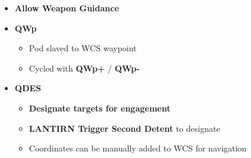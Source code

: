 \documentclass[fontInter]{TechCheck}
\begin{document}
\begin{longtableitemize}
{\begin{tableminipage}
			\begin{itemize}
				\item \textbf{Allow Weapon Guidance}
				\item \textbf{QWp}
				\begin{itemize}
					\item Pod slaved to WCS waypoint
					\item Cycled with \textbf{QWp+} / \textbf{QWp-}
				\end{itemize}
				\item \textbf{QDES}
				\begin{itemize}
					\item \textbf{Designate targets for engagement}
					\item \textbf{LANTIRN Trigger Second Detent} to designate
					\item Coordinates can be manually added to WCS for navigation
				\end{itemize}
			\end{itemize}
		\end{tableminipage}}
	\end{longtableitemize}

	\clearpage

	\hypertarget{subsec:lantirnlasingdesignation}{}
\end{document}
